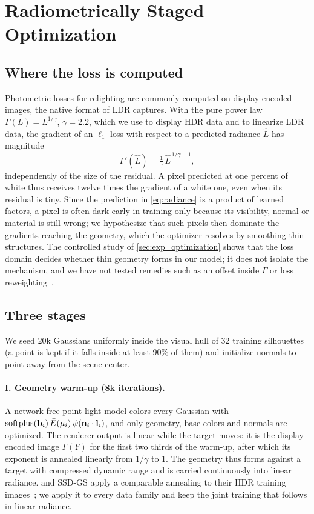\section{Radiometrically Staged Optimization}
\label{sec:optimization}

\subsection{Where the loss is computed}
\label{sec:lossdomain}
Photometric losses for relighting are commonly computed on display-encoded images, the native format of LDR captures.
With the pure power law $\Gamma(L)=L^{1/\gamma}$, $\gamma=2.2$, which we use to display HDR data and to linearize LDR data, the gradient of an $\ell_1$ loss with respect to a predicted radiance $\hat L$ has magnitude
\begin{equation}
  \Gamma'(\hat L)=\tfrac{1}{\gamma}\,\hat L^{\,1/\gamma-1},
  \label{eq:slope}
\end{equation}
independently of the size of the residual.
A pixel predicted at one percent of white thus receives twelve times the gradient of a white one, even when its residual is tiny.
Since the prediction in \cref{eq:radiance} is a product of learned factors, a pixel is often dark early in training only because its visibility, normal or material is still wrong; we hypothesize that such pixels then dominate the gradients reaching the geometry, which the optimizer resolves by smoothing thin structures.
The controlled study of \cref{sec:exp_optimization} shows that the loss domain decides whether thin geometry forms in our model; it does not isolate the mechanism, and we have not tested remedies such as an offset inside $\Gamma$ or loss reweighting~\cite{mildenhall2022nerf}.

\subsection{Three stages}
\label{sec:stages}
We seed 20k Gaussians uniformly inside the visual hull of 32 training silhouettes (a point is kept if it falls inside at least 90\% of them) and initialize normals to point away from the scene center.

\paragraph{I. Geometry warm-up (8k iterations).}
A network-free point-light model colors every Gaussian with $\operatorname{softplus}(\mathbf{b}_i)\,\bar E(\mu_i)\,\psi(\mathbf{n}_i\cdot\mathbf{l}_i)$, and only geometry, base colors and normals are optimized.
The renderer output is linear while the target moves: it is the display-encoded image $\Gamma(Y)$ for the first two thirds of the warm-up, after which its exponent is annealed linearly from $1/\gamma$ to $1$.
The geometry thus forms against a target with compressed dynamic range and is carried continuously into linear radiance.
\gsthree and SSD-GS apply a comparable annealing to their HDR training images~\cite{bi2024gs3,zheng2026ssdgs}; we apply it to every data family and keep the joint training that follows in linear radiance.

